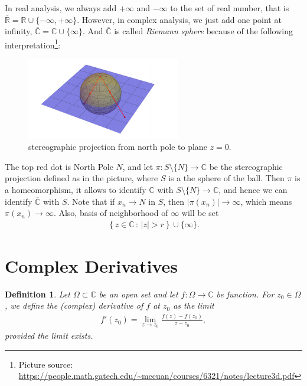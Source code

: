 \documentclass[11pt]{book}
\newtheorem{definition}{Definition}[chapter]
\theoremstyle{definition}
\numberwithin{equation}{chapter}
\begin{document}
In real analysis, we always add $+\infty$ and $-\infty$ to the set of real number, that is $\overline{\mathbb{R}} = \mathbb{R} \cup \{-\infty, +\infty\}$. However, in complex analysis, we just add one point at infinity, $\overline{\mathbb{C}} = \mathbb{C} \cup \{\infty\}$. And $\overline{\mathbb{C}}$ is called {\it Riemann sphere} because of the following interpretation\footnote{Picture source: \url{https://people.math.gatech.edu/~mccuan/courses/6321/notes/lecture3d.pdf}}:
\begin{figure}[H]
    \centering
    \includegraphics[width=0.6\textwidth]{p75}
    \caption{stereographic projection from north pole to plane $z = 0$.}
    \label{fig:stereographic_projection}
\end{figure}
The top red dot is North Pole $N$, and let $\pi: S\setminus\{N\} \to \mathbb{C}$ be the stereographic projection defined as in the picture, where $S$ is a the sphere of the ball. Then $\pi$ is a homeomorphism, it allows to identify $\mathbb{C}$ with $S\setminus\{N\} \to \mathbb{C}$, and hence we can identify $\overline{\mathbb{C}}$ with $S$. Note that if $x_n \to N$ in $S$, then $\left|\pi(x_n)\right| \to \infty$, which means $\pi(x_n) \to \infty$. Also, basis of neighborhood of $\infty$ will be set 
\begin{align*}
    \left\{z \in \mathbb{C} \,:\, \left|z\right| > r\right\} \cup \{\infty\}. 
\end{align*}

\medskip

\section{Complex Derivatives}

\begin{definition}\label{def_73}
Let $\Omega \subset \mathbb{C}$ be an open set and let $f: \Omega \to \mathbb{C}$ be function. For $z_0 \in \Omega$, we define the (complex) derivative of $f$ at $z_0$ as the limit
\begin{align*}
    f'(z_0) = \lim_{z \to z_0} \frac{f(z) - f(z_0)}{z - z_0},
\end{align*}
provided the limit exists.
\end{definition}
\end{document}

